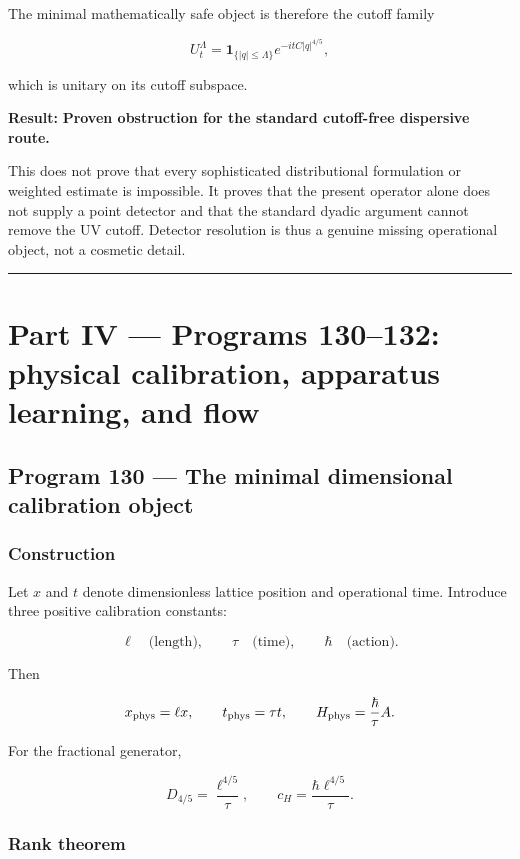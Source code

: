 \documentclass[11pt,a4paper,openany]{report}
\begin{document}
The minimal mathematically safe object is therefore the cutoff family

\[
U_t^\Lambda
=
\mathbf1_{\{|q|\le\Lambda\}}
e^{-itC|q|^{4/5}},
\]

which is unitary on its cutoff subspace.

\textbf{Result:} \textbf{Proven obstruction for the standard cutoff-free dispersive route.}

This does not prove that every sophisticated distributional formulation or weighted estimate is impossible. It proves that the present operator alone does not supply a point detector and that the standard dyadic argument cannot remove the UV cutoff. Detector resolution is thus a genuine missing operational object, not a cosmetic detail.

\par\medskip\hrule\medskip

\chapter{Part IV --- Programs 130--132: physical calibration, apparatus learning, and flow}

\section{Program 130 --- The minimal dimensional calibration object}

\subsection{Construction}

Let \(x\) and \(t\) denote dimensionless lattice position and operational time. Introduce three positive calibration constants:

\[
\ell\quad\text{(length)},\qquad
\tau\quad\text{(time)},\qquad
\hbar\quad\text{(action)}.
\]

Then

\[
x_{\rm phys}=\ell x,
\qquad
t_{\rm phys}=\tau t,
\qquad
H_{\rm phys}=\frac{\hbar}{\tau}A.
\]

For the fractional generator,

\[
D_{4/5}=\frac{\ell^{4/5}}{\tau},
\qquad
c_H=\frac{\hbar\ell^{4/5}}{\tau}.
\]

\subsection{Rank theorem}
\end{document}
